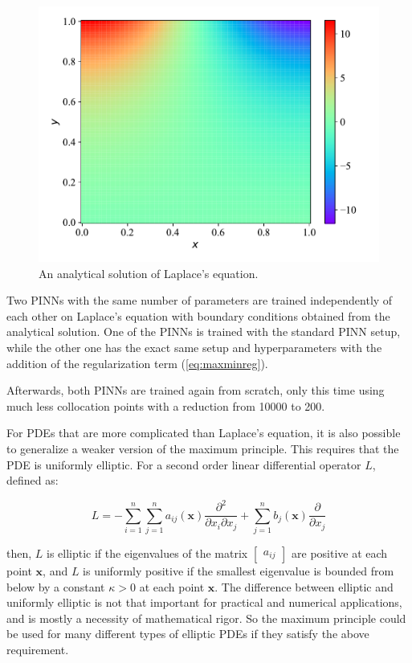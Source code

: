 \begin{figure}[H]
    \centering
    \includegraphics[width=1.0\linewidth]{Figures/IntermediateExperiments/Laplace/laplace_forward_true.pdf}
    \caption{An analytical solution of Laplace's equation.}
    \label{fig:laplace_analytical}
\end{figure}

Two PINNs with the same number of parameters are trained independently of each other on Laplace's equation with boundary conditions obtained from the analytical solution. One of the PINNs is trained with the standard PINN setup, while the other one has the exact same setup and hyperparameters with the addition of the regularization term (\ref{eq:maxminreg}).

Afterwards, both PINNs are trained again from scratch, only this time using much less collocation points with a reduction from 10000 to 200.

For PDEs that are more complicated than Laplace's equation, it is also possible to generalize a weaker version of the maximum principle. This requires that the PDE is uniformly elliptic. For a second order linear differential operator $L$, defined as:

\begin{equation}
    L = - \sum_{i=1}^{n} \sum_{j=1}^{n} a_{ij}(\bm{x}) \frac{\partial^2}{\partial x_i \partial x_j} + \sum_{j=1}^{n} b_j(\bm{x}) \frac{\partial}{\partial x_j}
\end{equation}

\noindent then, $L$ is elliptic if the eigenvalues of the matrix $\begin{bmatrix} a_{ij} \end{bmatrix}$ are positive at each point $\bm{x}$, and $L$ is uniformly positive if the smallest eigenvalue is bounded from below by a constant $\kappa > 0$ at each point $\bm{x}$. The difference between elliptic and uniformly elliptic is not that important for practical and numerical applications, and is mostly a necessity of mathematical rigor. So the maximum principle could be used for many different types of elliptic PDEs if they satisfy the above requirement.

